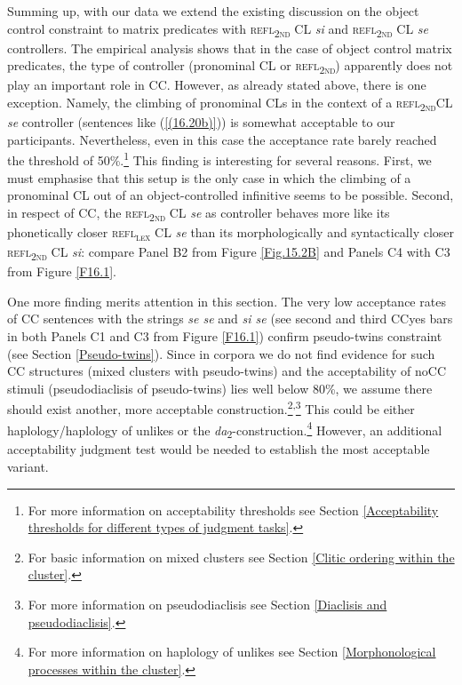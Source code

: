 Summing up, with our data we extend the existing discussion on the object control constraint to matrix predicates with \textsc{refl\textsubscript{2nd}} CL \textit{si} and \textsc{refl\textsubscript{2nd}} CL \textit{se} controllers. The empirical analysis shows that in the case of object control matrix predicates, the type of controller (pronominal CL or \textsc{refl\textsubscript{2nd}}) apparently does not play an important role in CC. However, as already stated above, there is one exception. Namely, the climbing of pronominal CLs in the context of a \textsc{refl\textsubscript{2nd}}CL \textit{se} controller (sentences like (\ref{(16.20b)})) is somewhat acceptable to our participants. Nevertheless, even in this case the acceptance rate barely reached the threshold of 50\%.\footnote{For more information on acceptability thresholds see Section \ref{Acceptability thresholds for different types of judgment tasks}.} This finding is interesting for several reasons. First, we must emphasise that this setup is the only case in which the climbing of a pronominal CL out of an object-controlled infinitive seems to be possible. Second, in respect of CC, the \textsc{refl\textsubscript{2nd}} CL \textit{se} as controller behaves more like its phonetically closer \textsc{refl\textsubscript{\textsc{lex}}} CL \textit{se} than its morphologically and syntactically closer \textsc{refl\textsubscript{2nd}} CL \textit{si}: compare Panel B2 from Figure \ref{Fig.15.2B} and Panels C4 with C3 from Figure \ref{F16.1}.

One more finding merits attention in this section. The very low acceptance rates of CC sentences with the strings \textit{se se} and \textit{si se} (see second and third CCyes bars in both Panels C1 and C3 from Figure \ref{F16.1}) confirm \citet[][79]{Junghanns02} pseudo-twins constraint (see Section \ref{Pseudo-twins}). Since in corpora we do not find evidence for such CC structures (mixed clusters with pseudo-twins) and the acceptability of noCC stimuli (pseudodiaclisis of pseudo-twins) lies well below 80\%, we assume there should exist another, more acceptable construction.\footnote{For basic information on mixed clusters see Section \ref{Clitic ordering within the cluster}.}\textsuperscript{,}\footnote{For more information on pseudodiaclisis see Section \ref{Diaclisis and pseudodiaclisis}.} This could be either haplology/haplology of unlikes or the \textit{da}\textsubscript{2}-construction.\footnote{For more information on haplology of unlikes see Section \ref{Morphonological processes within the cluster}.} However, an additional acceptability judgment test would be needed to establish the most acceptable variant. 

